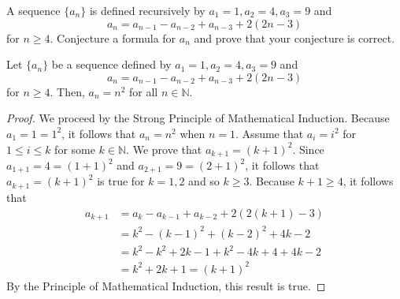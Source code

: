 \documentclass[12pt]{article}
\newcommand{\N}{\mathbb{N}}
\newenvironment{result}[2][Result]{\begin{trivlist}
			\item[\hskip \labelsep {\bfseries #1}\hskip \labelsep {\bfseries #2.}]}{\end{trivlist}}
\newenvironment{problem}[2][Problem]{\begin{trivlist}
		\item[\hskip \labelsep {\bfseries #1}\hskip \labelsep {\bfseries #2.}]}{\end{trivlist}}
\begin{document}
	\begin{problem}{43}
		A sequence $\{a_{n}\}$ is defined recursively by $a_{1} = 1, a_{2} = 4, a_{3} = 9$ and 
		\begin{equation*}
			a_{n} = a_{n-1} - a_{n-2} + a_{n-3} +2(2n-3)
		\end{equation*}
		for $n\geq 4$. Conjecture a formula for $a_{n}$ and prove that your conjecture is correct.
		\begin{result}{}
			Let $\{a_{n}\}$ be a sequence defined by $a_{1} = 1, a_{2} = 4, a_{3} = 9$ and
				\begin{equation*}
				a_{n} = a_{n-1} - a_{n-2} + a_{n-3} +2(2n-3)
			\end{equation*}
			for $n\geq 4$. Then, $a_{n} = n^{2}$ for all $n\in \N$.
		\end{result}
		\begin{proof}
			We proceed by the Strong Principle of Mathematical Induction. Because $a_{1} = 1 = 1^{2}$, it follows that $a_{n} = n^{2}$ when $n=1$. Assume that $a_{i} = i^{2}$ for $1\leq i \leq k$ for some $k\in \N$. We prove that $a_{k+1}= (k+1)^{2}$. Since $a_{1+1} = 4 = (1+1)^{2}$ and $a_{2+1} = 9 = (2+1)^{2}$, it follows that $a_{k+1}= (k+1)^{2}$ is true for $k=1,2$ and so $k\geq 3$. Because $k+1\geq 4$, it follows that
			\begin{align*}
				a_{k+1} &= a_{k} - a_{k-1} + a_{k-2} +2(2(k+1)-3)\\
				&= k^{2} - (k-1)^{2} + (k-2)^{2} + 4k-2\\
				&= k^{2} - k^{2} +2k-1+k^{2} -4k +4 +4k-2\\
				&= k^{2} +2k+1 = (k+1)^{2}
			\end{align*} 
		By the Principle of Mathematical Induction, this result is true.
		\end{proof}
	\end{problem}
\end{document}
